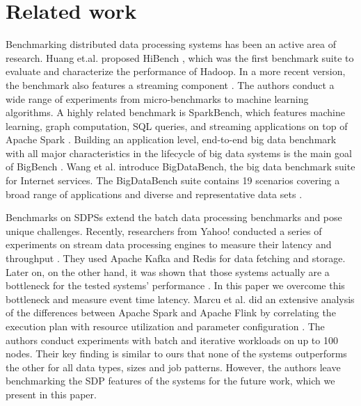\section{Related work}
\label{rel}
Benchmarking distributed data processing systems has been an active area of research. Huang et.al. proposed HiBench \cite{huang2011hibench}, which was the first benchmark suite to evaluate and characterize the performance of  Hadoop. In a more recent version, the benchmark also features a streaming component \cite{white2012hadoop}. The authors conduct a wide range of experiments from micro-benchmarks to machine learning algorithms. A highly related benchmark is SparkBench, which features machine learning, graph computation, SQL queries, and streaming applications on top of Apache Spark \cite{li2015sparkbench}.
Building an application level, end-to-end big data benchmark with all major characteristics in the lifecycle of big data systems  is the main goal of BigBench \cite{ghazal2013bigbench}.
Wang et al. introduce BigDataBench, the big data benchmark suite for Internet services. The BigDataBench suite contains  19 scenarios covering a broad range of applications and diverse and representative data sets \cite{wang2014bigdatabench}.

Benchmarks on SDPSs extend the batch data processing benchmarks and pose unique challenges. Recently, researchers from Yahoo! conducted a series of experiments on stream data processing engines to measure their latency and throughput \cite{chintapalli2016benchmarking}. They used Apache Kafka \cite{kafka2014high} and Redis \cite{carlson2013redis} for data fetching and storage. Later on, on the other hand, it was shown that those systems actually are a bottleneck for the tested systems' performance \cite{dataartisans}. In this paper we overcome this bottleneck and measure event time latency. Marcu et al. did an extensive analysis of the differences between Apache Spark and Apache Flink by correlating the execution plan with  resource utilization and  parameter configuration \cite{marcu2016spark}. The authors conduct experiments with batch and iterative workloads on up to 100 nodes. Their key finding is similar to ours that none of the  systems outperforms the other for all data types, sizes and job patterns. However, the authors leave benchmarking the SDP features of the systems  for the future work, which we present in this paper.

